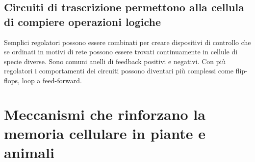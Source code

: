 \subsection{Circuiti di trascrizione permettono alla cellula di compiere operazioni logiche}
Semplici regolatori possono essere combinati per creare dispositivi di controllo che se ordinati in motivi di rete possono essere trovati continuamente in cellule di specie diverse. 
Sono comuni anelli di feedback positivi e negativi. Con pi\`u regolatori i comportamenti dei circuiti possono diventari pi\`u complessi come flip-flops, loop a feed-forward. 
\section{Meccanismi che rinforzano la memoria cellulare in piante e animali}
